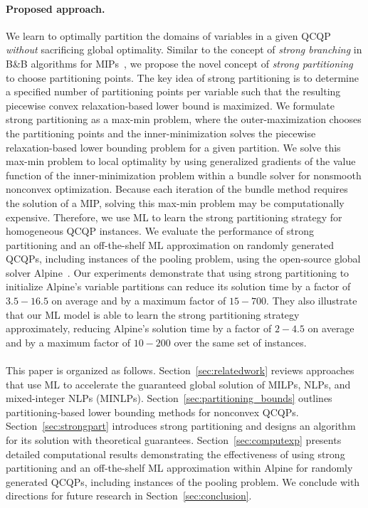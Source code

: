 \documentclass{article}
\newcommand{\pp}{partitioning points}
\begin{document}
\paragraph{Proposed approach.} 
We learn to optimally partition the domains of variables in a given QCQP \textit{without} sacrificing global optimality.
Similar to the concept of \textit{strong branching} in B\&B algorithms for MIPs~\cite{achterberg2007constraint,belotti2009branching}, we propose the novel concept of \textit{strong partitioning} to choose {\pp}.
The key idea of strong partitioning is to determine a specified number of {\pp} per variable such that the resulting piecewise convex relaxation-based lower bound is maximized.
We formulate strong partitioning as a max-min problem, where the outer-maximization chooses the {\pp} and the inner-minimization solves the piecewise relaxation-based lower bounding problem for a given partition.
We solve this \mbox{max-min} problem to local optimality by using generalized gradients of the value function of the inner-minimization problem within a bundle solver for nonsmooth nonconvex optimization.
Because each iteration of the bundle method requires the solution of a MIP, solving this \mbox{max-min} problem may be computationally expensive.
Therefore, we use ML to learn the strong partitioning strategy for homogeneous QCQP instances.
We evaluate the performance of strong partitioning and an off-the-shelf ML approximation on randomly generated QCQPs, including instances of the pooling problem, using the open-source global solver Alpine~\cite{nagarajan2019adaptive,nagarajan2016tightening}. 
Our experiments demonstrate that using strong partitioning to initialize Alpine's variable partitions can reduce its solution time by a factor of $\mathit{3.5 - 16.5}$ on average and by a maximum factor of $\mathit{15 - 700}$.
They also illustrate that our ML model is able to learn the strong partitioning strategy approximately, reducing Alpine's solution time by a factor of $\mathit{2 - 4.5}$ on average and by a maximum factor of $\mathit{10 - 200}$ over the same set of instances.


\paragraph*{}
This paper is organized as follows.
Section~\ref{sec:relatedwork} reviews approaches that use ML to accelerate the guaranteed global solution of MILPs, NLPs, and mixed-integer NLPs (MINLPs).
Section~\ref{sec:partitioning_bounds} outlines partitioning-based lower bounding methods for nonconvex QCQPs.
Section~\ref{sec:strongpart} introduces strong partitioning and designs an algorithm for its solution with theoretical guarantees.
Section~\ref{sec:computexp} presents detailed computational results demonstrating the effectiveness of using strong partitioning and an off-the-shelf ML approximation within Alpine for randomly generated QCQPs, including instances of the pooling problem.
We conclude with directions for future research in Section~\ref{sec:conclusion}.
\end{document}
